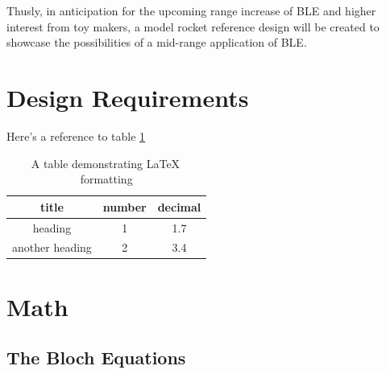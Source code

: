 \documentclass{workreport}
\begin{document}
\begin{body}
	Thusly, in anticipation for the upcoming range increase of BLE and higher interest from toy makers, a model rocket reference design will be created to showcase the possibilities of a mid-range application of BLE.

\section{Design Requirements}

	

Here's a reference to table \ref{tbl:exampletable}

\begin{table}

	\centering

	\begin{tabular}{|c|c|c|} \hline
		title & number & decimal \\ \hline
		heading & 1 & 1.7 \\ \hline
		another heading & 2 & 3.4 \\ \hline
	\end{tabular}
	\caption{A table demonstrating \LaTeX \, formatting}

	\label{tbl:exampletable}

\end{table}

\section{Math}

	\lipsum[1]

\subsection{The Bloch Equations}


\end{body}
\end{document}
